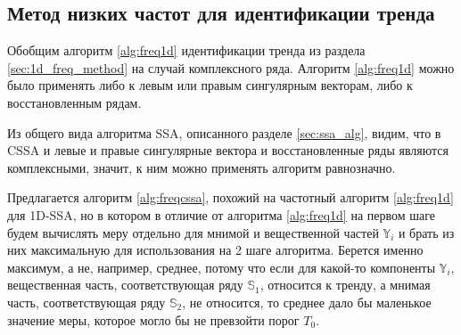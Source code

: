 \documentclass[specialist,
               substylefile = spbu.rtx,
               subf,href,colorlinks=true, 12pt]{disser}
\begin{document}
%

\subsection{Метод низких частот для идентификации тренда}
\label{sec:freq_method_cssa}
Обобщим алгоритм \ref{alg:freq1d} идентификации тренда из раздела \ref{sec:1d_freq_method} на случай комплексного ряда. Алгоритм \ref{alg:freq1d} можно было применять либо к левым или правым сингулярным векторам, либо к восстановленным рядам. 


Из общего вида алгоритма SSA, описанного  разделе \ref{sec:ssa_alg}, видим, что в CSSA и левые и правые сингулярные вектора и восстановленные ряды являются комплексными, значит, к ним можно применять алгоритм равнозначно.

Предлагается алгоритм \ref{alg:freqcssa}, похожий на частотный алгоритм \ref{alg:freq1d} для 1D-SSA, но в котором в отличие от алгоритма \ref{alg:freq1d} на первом шаге будем вычислять меру отдельно для мнимой и вещественной частей $\mathbb{Y}_i$ и брать из них максимальную для использования на 2 шаге алгоритма. 
Берется именно максимум, а не, например, среднее, потому что если для какой-то компоненты $\mathbb{Y}_i$, вещественная часть, соответствующая ряду $\mathbb{S}_1$, относится к тренду, а мнимая часть, соответствующая ряду $\mathbb{S}_2$, не относится, то среднее дало бы маленькое значение меры, которое могло бы не превзойти порог $T_0$.
\end{document}
